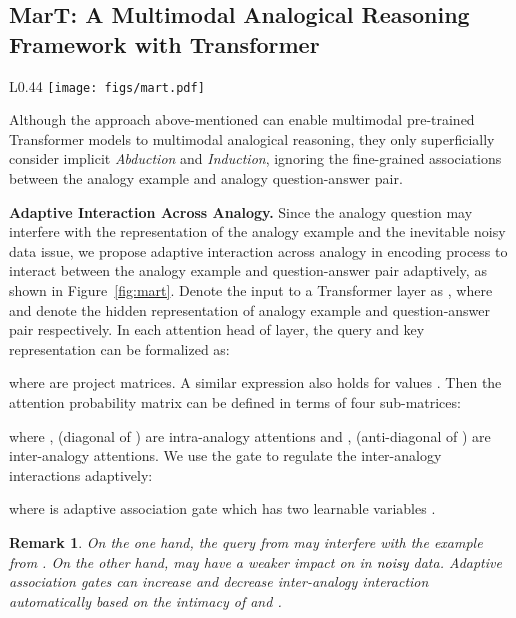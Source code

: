 \documentclass{article} \usepackage{iclr2023_conference,times}
\newtheorem{remark}{\noindent \textbf{Remark}}
\newcommand{\ours}{MarT}
\begin{document}
\subsection{{\ours}: A Multimodal Analogical Reasoning Framework with Transformer}

\begin{wrapfigure}{L}{0.44\textwidth}
\centering \texttt{[image: figs/mart.pdf]}
\caption{The {\ours} framework.}
\label{fig:mart}
\vspace{-0.2cm}
\end{wrapfigure}

Although the approach above-mentioned can enable multimodal pre-trained Transformer models to multimodal analogical reasoning, they only superficially consider implicit \textit{Abduction} and  \textit{Induction}, ignoring the fine-grained associations between the analogy example and analogy question-answer pair.


\textbf{Adaptive Interaction Across Analogy.}
Since the analogy question may interfere with the representation of the analogy example and the inevitable noisy data issue, we propose adaptive interaction across analogy in encoding process to interact between the analogy example and question-answer pair adaptively, as shown in Figure~\ref{fig:mart}.
Denote the input to a Transformer layer as , where  and  
 denote the hidden representation of analogy example  and question-answer pair  respectively. 
In each attention head of layer, the query and key representation can be formalized as:
\begin{small}

\end{small}where  are project matrices. 
A similar expression also holds for values .
Then the attention probability matrix  can be defined in terms of four sub-matrices:
\begin{small}

\end{small}where ,  (diagonal of ) are intra-analogy attentions and ,  (anti-diagonal of ) are inter-analogy attentions. We use the gate  to regulate the inter-analogy interactions adaptively:
\begin{small}

\end{small}where  is adaptive association gate which has two learnable variables .
\begin{remark}
On the one hand, the query from  may interfere with the example from .
On the other hand,  may have a weaker impact on  in \textcolor{black}{noisy} data. 
Adaptive association gates can increase and decrease inter-analogy interaction automatically based on the intimacy of  and .
\end{remark}
\end{document}
